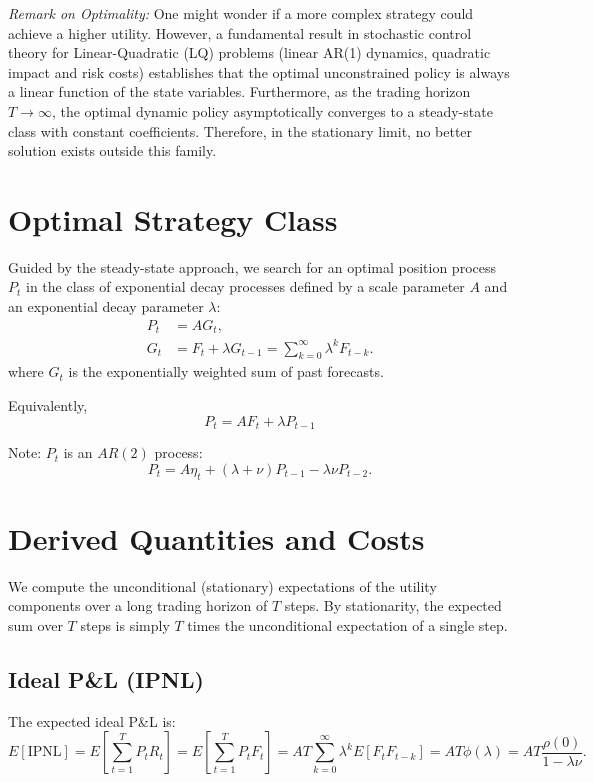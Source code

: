 \documentclass[11pt]{article}
\begin{document}
\textit{Remark on Optimality:} One might wonder if a more complex strategy could achieve a higher utility. However, a fundamental result in stochastic control theory for Linear-Quadratic (LQ) problems (linear AR(1) dynamics, quadratic impact and risk costs) establishes that the optimal unconstrained policy is always a linear function of the state variables. Furthermore, as the trading horizon $T \to \infty$, the optimal dynamic policy asymptotically converges to a steady-state class with constant coefficients. Therefore, in the stationary limit, no better solution exists outside this family.

\section{Optimal Strategy Class}

Guided by the steady-state approach, we search for an optimal position process $P_t$ in the class of exponential decay processes defined by a scale parameter $A$ and an exponential decay parameter $\lambda$:
\begin{equation}
\begin{aligned}
    P_t &= A G_t, \\
    G_t &= F_t + \lambda G_{t-1} = \sum_{k=0}^\infty \lambda^k F_{t-k}.
\end{aligned}
\end{equation}
where $G_t$ is the exponentially weighted sum of past forecasts.

Equivalently, 
\begin{equation}
P_t = A F_t + \lambda P_{t-1}
\end{equation}

Note: $P_t$ is an $AR(2)$ process: 
\begin{equation}
    P_t =  A \eta_t + (\lambda + \nu) P_{t-1} - \lambda \nu P_{t-2}.
\end{equation}

\section{Derived Quantities and Costs}

We compute the unconditional (stationary) expectations of the utility components over a long trading horizon of $T$ steps. By stationarity, the expected sum over $T$ steps is simply $T$ times the unconditional expectation of a single step.

\subsection{Ideal P\&L (IPNL)}
The expected ideal P\&L is:
\begin{equation}
    E[\text{IPNL}] = E\left[ \sum_{t=1}^T P_t R_t \right] = E\left[ \sum_{t=1}^T P_t F_t \right] = A T \sum_{k=0}^\infty \lambda^k E[F_t F_{t-k}] = A T \phi(\lambda) = A T \frac{\rho(0)}{1 - \lambda \nu}.
\end{equation}
\end{document}
